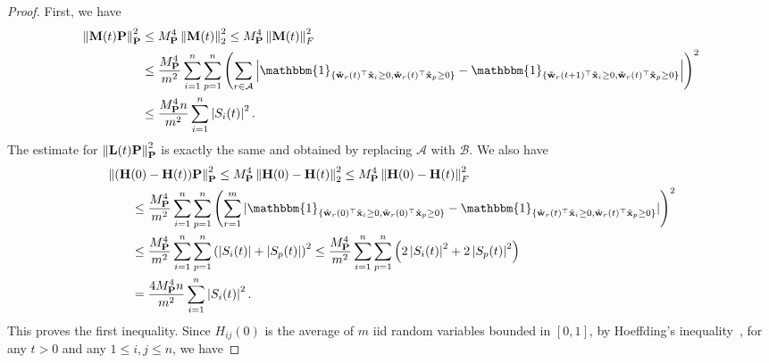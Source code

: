 \begin{proof}
First, we have
\begin{align*}
    \normp{\mathbf{M}(t)\mathbf{P}}^2 & \leq M_{\mathbf{P}}^4 \norm{\mathbf{M}(t)}_2^2 \leq M_{\mathbf{P}}^4 \norm{\mathbf{M}(t)}_F^2 \\
    &\leq \frac{ M_{\mathbf{P}}^4}{m^2} \sum_{i=1}^n \sum_{p=1}^n \left(\sum_{r \in \mathcal{A}} \left|\mathbbm{1}_{\{\tilde{\mathbf{w}}_r(t)^\top \tilde{\mathbf{x}}_i \geq 0, \tilde{\mathbf{w}}_r(t)^\top \tilde{\mathbf{x}}_p \geq 0\}} - \mathbbm{1}_{\{\tilde{\mathbf{w}}_r(t+1)^\top \tilde{\mathbf{x}}_i \geq 0, \tilde{\mathbf{w}}_r(t)^\top \tilde{\mathbf{x}}_p \geq 0\}}\right|\right)^2 \\    
    &\leq \frac{M_{\mathbf{P}}^4 n}{m^2} \sum_{i=1}^n \abs{S_i(t)}^2.
\end{align*}
The estimate for $\left\lVert\mathbf{L}(t)\mathbf{P}\right\rVert_{\mathbf{P}}^2$ is exactly the same and obtained by replacing $\mathcal{A}$ with $\mathcal{B}$. We also have
\begin{align*}
    &\normp{(\mathbf{H}(0) - \mathbf{H}(t))\mathbf{P}}^2 \leq M_{\mathbf{P}}^4 \norm{\mathbf{H}(0) - \mathbf{H}(t)}_2^2 \leq M_{\mathbf{P}}^4 \norm{\mathbf{H}(0) - \mathbf{H}(t)}_F^2 \\
    &\qquad\leq \frac{M_{\mathbf{P}}^4}{m^2} \sum_{i=1}^n \sum_{p=1}^n \left(\sum_{r = 1}^m |\mathbbm{1}_{\{\tilde{\mathbf{w}}_r(0)^\top \tilde{\mathbf{x}}_i \geq 0, \tilde{\mathbf{w}}_r(0)^\top \tilde{\mathbf{x}}_p \geq 0\}} - \mathbbm{1}_{\{\tilde{\mathbf{w}}_r(t)^\top \tilde{\mathbf{x}}_i \geq 0, \tilde{\mathbf{w}}_r(t)^\top \tilde{\mathbf{x}}_p \geq 0\}}|\right)^2 \\    
    &\qquad\leq \frac{M_{\mathbf{P}}^4}{m^2} \sum_{i=1}^n \sum_{p=1}^n \left(\abs{S_i(t)} + \abs{S_p(t)}\right)^2 \leq \frac{M_{\mathbf{P}}^4}{m^2} \sum_{i=1}^n \sum_{p=1}^n \left(2\abs{S_i(t)}^2 + 2\abs{S_p(t)}^2\right) \\
    &\qquad= \frac{4M_{\mathbf{P}}^4 n}{m^2} \sum_{i=1}^n \abs{S_i(t)}^2.
\end{align*}
This proves the first inequality. Since $H_{ij}(0)$ is the average of $m$ iid random variables bounded in $[0,1]$, by Hoeffding's inequality~\citep{hoeffding1994}, for any $t > 0$ and any $1 \leq i, j \leq n$, we have

\end{proof}

